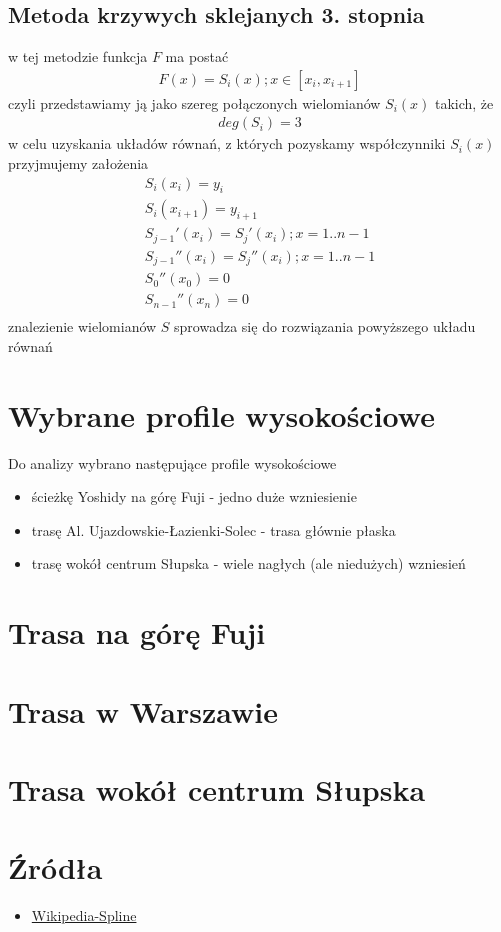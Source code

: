 \documentclass{article}
\begin{document}
\subsection{Metoda krzywych sklejanych 3. stopnia}
w tej metodzie funkcja $F$ ma postać
\begin{gather*}
	F(x) = S_i(x); x\in [x_i, x_{i+1}]
\end{gather*}
czyli przedstawiamy ją jako szereg połączonych wielomianów $S_i(x)$ takich, że
\begin{gather*}
	deg (S_i) = 3
\end{gather*}
w celu uzyskania układów równań, z których pozyskamy współczynniki $S_i(x)$ przyjmujemy założenia
\begin{gather*}
	S_i(x_i) = y_i \\
	S_i(x_{i+1}) = y_{i+1} \\
	S_{j-1}'(x_i) = S_{j}'(x_i); x = 1..n-1 \\
	S_{j-1}''(x_i) = S_{j}''(x_i); x = 1..n-1 \\
	S_0''(x_0) = 0 \\
	S_{n-1}'' (x_n) = 0 \\
\end{gather*}
znalezienie wielomianów $S$ sprowadza się do rozwiązania powyższego układu równań
\section{Wybrane profile wysokościowe}
Do analizy wybrano następujące profile wysokościowe
\begin{itemize}
	\item ścieżkę Yoshidy na górę Fuji - jedno duże wzniesienie
	\item trasę Al.  Ujazdowskie-Łazienki-Solec - trasa głównie płaska
	\item trasę wokół centrum Słupska - wiele nagłych (ale niedużych) wzniesień
\end{itemize}
\section{Trasa na górę Fuji}
\section{Trasa w Warszawie}
\section{Trasa wokół centrum Słupska}
\section{Źródła}
\begin{itemize}
	\item \href{https://en.wikipedia.org/w/index.php?title=Spline_%28mathematics%29&oldid=288288033#Algorithm_for_computing_natural_cubic_splines}{Wikipedia-Spline}
\end{itemize}
\end{document}
